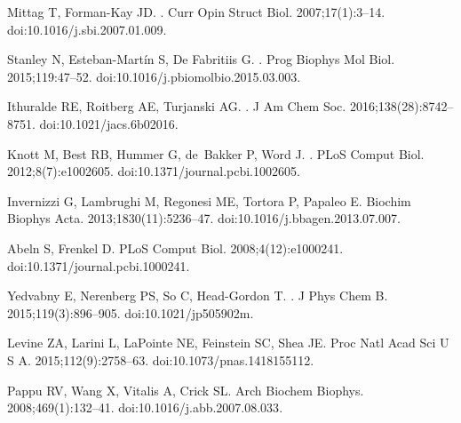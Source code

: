 \documentclass[10pt,letterpaper]{article}
\begin{document}
\begin{thebibliography}{10}
Mittag T, Forman-Kay JD.
.
\newblock Curr Opin Struct Biol. 2007;17(1):3--14.
\newblock doi:{10.1016/j.sbi.2007.01.009}.

Stanley N, Esteban-Mart{\'{i}}n S, {De Fabritiis} G.
.
\newblock Prog Biophys Mol Biol. 2015;119:47--52.
\newblock doi:{10.1016/j.pbiomolbio.2015.03.003}.

Ithuralde RE, Roitberg AE, Turjanski AG.
.
\newblock J Am Chem Soc. 2016;138(28):8742--8751.
\newblock doi:{10.1021/jacs.6b02016}.

Knott M, Best RB, Hummer G, de~Bakker P, Word J.
.
\newblock PLoS Comput Biol. 2012;8(7):e1002605.
\newblock doi:{10.1371/journal.pcbi.1002605}.

Invernizzi G, Lambrughi M, Regonesi ME, Tortora P, Papaleo E.
\newblock Biochim Biophys Acta. 2013;1830(11):5236--47.
\newblock doi:{10.1016/j.bbagen.2013.07.007}.

Abeln S, Frenkel D.
\newblock PLoS Comput Biol. 2008;4(12):e1000241.
\newblock doi:{10.1371/journal.pcbi.1000241}.

Yedvabny E, Nerenberg PS, So C, Head-Gordon T.
.
\newblock J Phys Chem B. 2015;119(3):896--905.
\newblock doi:{10.1021/jp505902m}.

Levine ZA, Larini L, LaPointe NE, Feinstein SC, Shea JE.
\newblock Proc Natl Acad Sci U S A. 2015;112(9):2758--63.
\newblock doi:{10.1073/pnas.1418155112}.

Pappu RV, Wang X, Vitalis A, Crick SL.
\newblock Arch Biochem Biophys. 2008;469(1):132--41.
\newblock doi:{10.1016/j.abb.2007.08.033}.


\end{thebibliography}
\end{document}
